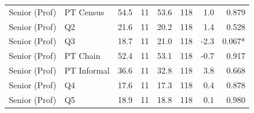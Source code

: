 \begin{tabular}{llrrrrrr}
Senior (Prof) & PT Census &  54.5 &   11 &  53.6 &  118 &   1.0 &  0.879 \\
Senior (Prof) & Q2 &  21.6 &   11 &  20.2 &  118 &   1.4 &  0.528 \\
Senior (Prof) & Q3 &  18.7 &   11 &  21.0 &  118 &  -2.3 &  0.067* \\
Senior (Prof) & PT Chain &  52.4 &   11 &  53.1 &  118 &  -0.7 &  0.917 \\
Senior (Prof) & PT Informal &  36.6 &   11 &  32.8 &  118 &   3.8 &  0.668 \\
Senior (Prof) & Q4 &  17.6 &   11 &  17.3 &  118 &   0.4 &  0.878 \\
Senior (Prof) & Q5 &  18.9 &   11 &  18.8 &  118 &   0.1 &  0.980 \\
\hline
\end{tabular}
